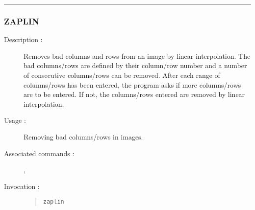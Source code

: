 \hrule
\subsubsection*{\label{ZAPLIN}ZAPLIN}

\begin{description}

\item[Description :] Removes bad columns and rows from an image by
linear interpolation.  The bad columns/rows are defined by their
column/row number and a number of consecutive columns/rows can be
removed.  After each range of columns/rows has been entered, the
program asks if more columns/rows are to be entered.  If not, the
columns/rows entered are removed by linear interpolation.

\item[Usage :] Removing bad columns/rows in images.

\item[Associated commands :] {\tt {}},
{\tt {}}

\item[Invocation :]

\begin{quote}{\tt  zaplin }\end{quote}

\end{description}




